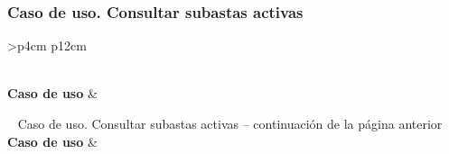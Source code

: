 \subsubsection{Caso de uso. Consultar subastas activas} \label{sec:cu_consultar-subastas}
\begin{longtable}{
    >{}p{4cm}
    p{12cm}
    }
    \caption{Caso de uso. Consultar subastas activas} \label{table:cu_consultar-subastas} \\
    \toprule
    \textbf{Caso de uso} &  \\
    \endfirsthead
    
    {{ \tablename\ \thetable{} Caso de uso. Consultar subastas activas -- continuación de la página anterior}} \\
    \toprule
    \textbf{Caso de uso} &  \\
    \midrule
    \endhead
    
    \midrule
     \\ 
    \endfoot
    
    \bottomrule
    \endlastfoot
    

\end{longtable}
